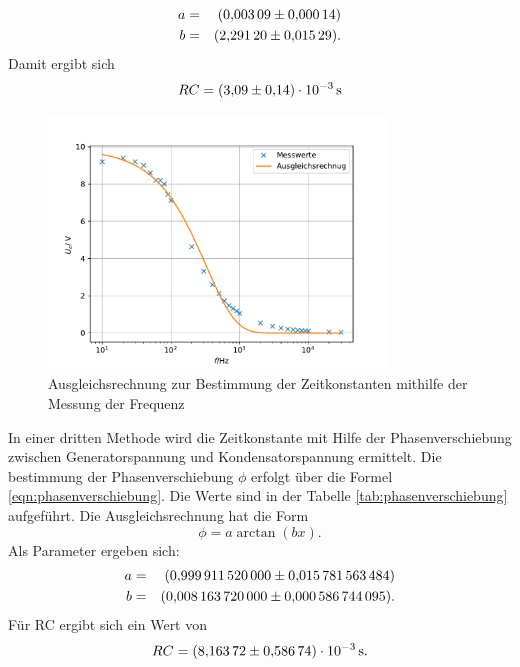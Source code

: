 \begin{align*}
  a &=& \SI{0.00309 \pm 0.00014}{}\\
  b &=& \SI{2.29120 \pm 0.01529}{}.\\
\end{align*}
Damit ergibt sich
\begin{equation*}
  RC = \SI{3.09\pm0.14e-3}{s}
\end{equation*}

\begin{figure}
  \centering
  \includegraphics[width=0.8\textwidth]{Freq.pdf}
  \caption{Ausgleichsrechnung zur Bestimmung der Zeitkonstanten mithilfe der Messung der Frequenz}
  \label{fig:frequenz}
\end{figure}
%
%
In einer dritten Methode wird die Zeitkonstante mit Hilfe der Phasenverschiebung zwischen Generatorspannung und Kondensatorspannung ermittelt. Die bestimmung der Phasenverschiebung
$\phi$ erfolgt über die Formel \eqref{eqn:phasenverschiebung}.
Die Werte sind in der Tabelle \ref{tab:phasenverschiebung} aufgeführt.
Die Ausgleichsrechnung hat die Form
\begin{equation*}
   \phi= a\arctan{(bx)}.
\end{equation*}
Als Parameter ergeben sich:
\begin{align*}
  a &=& \SI{0.99991152\pm0.015781563484}{}\\
  b &=& \SI{0.00816372\pm0.000586744095}{}.\\
\end{align*}
Für RC ergibt sich ein Wert von
\begin{equation*}
   RC =  \SI{8.16372 \pm 0.58674e-3}{s}.
\end{equation*}
